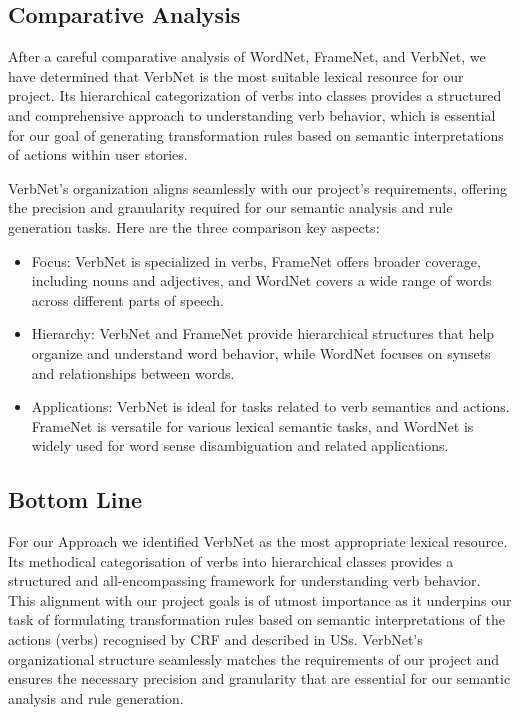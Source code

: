 \subsection{Comparative Analysis} \label{sec_5_campare}
After a careful comparative analysis of WordNet, FrameNet, and VerbNet, we have determined that VerbNet is the most suitable lexical resource for our project. Its hierarchical categorization of verbs into classes provides a structured and comprehensive approach to understanding verb behavior, which is essential for our goal of generating transformation rules based on semantic interpretations of actions within user stories. 

VerbNet's organization aligns seamlessly with our project's requirements, offering the precision and granularity required for our semantic analysis and rule generation tasks.
Here are the three comparison key aspects:
\begin{itemize}
\item Focus: VerbNet is specialized in verbs, FrameNet offers broader coverage, including nouns and adjectives, and WordNet covers a wide range of words across different parts of speech.
\item Hierarchy: VerbNet and FrameNet provide hierarchical structures that help organize and understand word behavior, while WordNet focuses on synsets and relationships between words.
\item Applications: VerbNet is ideal for tasks related to verb semantics and actions. FrameNet is versatile for various lexical semantic tasks, and WordNet is widely used for word sense disambiguation and related applications.
\end{itemize}
\subsection{Bottom Line}\label{nlp_bottom_line}
For our Approach we identified VerbNet as the most appropriate lexical resource. Its methodical categorisation of verbs into hierarchical classes provides a structured and all-encompassing framework for understanding verb behavior. This alignment with our project goals is of utmost importance as it underpins our task of formulating transformation rules based on semantic interpretations of the actions (verbs) recognised by CRF and described in USs. VerbNet's organizational structure seamlessly matches the requirements of our project and ensures the necessary precision and granularity that are essential for our semantic analysis and rule generation.


